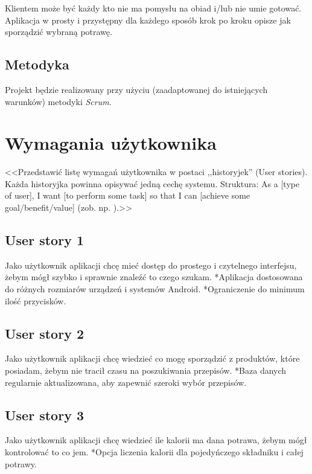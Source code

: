 \documentclass[a4paper]{article}
\begin{document}
	Klientem może być każdy kto nie ma pomysłu na obiad i/lub nie umie gotować. Aplikacja w prosty i przystępny dla każdego sposób krok po kroku opisze jak sporządzić wybraną potrawę.
	
	\subsection{Metodyka}
	
	Projekt będzie realizowany przy użyciu (zaadaptowanej do istniejących warunków) metodyki {\em Scrum}. 
	
	\section{Wymagania użytkownika}
	<<Przedstawić listę wymagań użytkownika w postaci ,,historyjek'' (User stories). Każda historyjka powinna opisywać jedną cechę systemu. Struktura: As a [type of user], I want [to perform some task] so that I can [achieve some goal/benefit/value] (zob. np. \cite{us}).>>
	
	\subsection{User story 1}
	Jako użytkownik aplikacji chcę mieć dostęp do prostego i czytelnego interfejsu, żebym mógł szybko i sprawnie znaleźć to czego szukam. \newline
	*Aplikacja dostosowana do różnych rozmiarów urządzeń i systemów Android.\newline
	*Ograniczenie do minimum ilość przycisków.
	
	\subsection{User story 2}
	Jako użytkownik aplikacji chcę wiedzieć co mogę sporządzić z produktów, które posiadam, żebym nie tracił czasu na poszukiwania przepisów. \newline
	*Baza danych regularnie aktualizowana, aby zapewnić szeroki wybór przepisów.
	
	\subsection{User story 3}
	Jako użytkownik aplikacji chcę wiedzieć ile kalorii ma dana potrawa, żebym mógł kontrolować to co jem. \newline
	*Opcja liczenia kalorii dla pojedyńczego składniku i całej potrawy.
	
\end{document}
